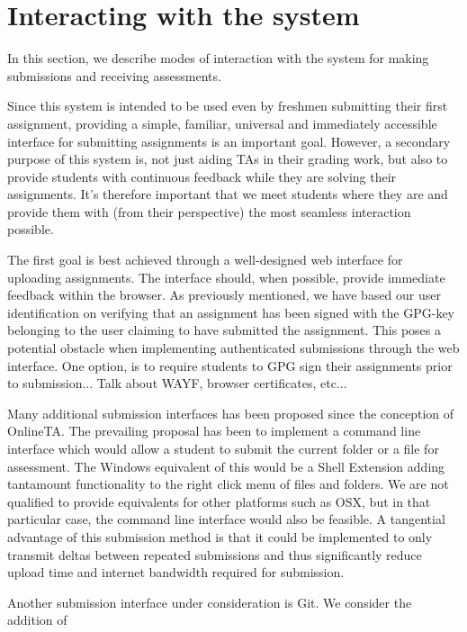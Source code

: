 \section{Interacting with the system}
In this section, we describe modes of interaction with the system for
making submissions and receiving assessments.

Since this system is intended to be used even by freshmen submitting
their first assignment, providing a simple, familiar, universal and
immediately accessible interface for submitting assignments is an
important goal. However, a secondary purpose of this system is, not
just aiding TAs in their grading work, but also to provide students
with continuous feedback while they are solving their
assignments. It's therefore important that we meet students where they
are and provide them with (from their perspective) the most seamless
interaction possible.

The first goal is best achieved through a well-designed web interface
for uploading assignments. The interface should, when
possible, provide immediate feedback within the browser. As previously
mentioned, we have based our user identification on verifying that an
assignment has been signed with the GPG-key belonging to the user
claiming to have submitted the assignment. This poses a potential
obstacle when implementing authenticated submissions through the web
interface. One option, is to require students to GPG sign their
assignments prior to submission... Talk about WAYF, browser
certificates, etc...

Many additional submission interfaces has been proposed since the
conception of OnlineTA. The prevailing proposal has been to implement
a command line interface which would allow a student to submit the
current folder or a file for assessment. The Windows equivalent of
this would be a Shell Extension adding tantamount functionality to the
right click menu of files and folders. We are not qualified to provide
equivalents for other platforms such as OSX, but in that particular
case, the command line interface would also be feasible. A tangential
advantage of this submission method is that it could be implemented to
only transmit deltas between repeated submissions and thus
significantly reduce upload time and internet bandwidth required for
submission.

Another submission interface under consideration is Git. We consider
the addition of 


